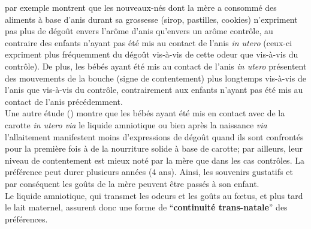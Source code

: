 \documentclass[french]{article}
\begin{document}
				\cite{schaal2000} par exemple montrent que les nouveaux-nés dont la mère a consommé des aliments à base d'anis durant sa grossesse (sirop, pastilles, cookies) n'expriment pas plus de dégoût envers l'arôme d'anis qu'envers un arôme contrôle, au contraire des enfants n'ayant pas été mis au contact de l'anis \textit{in utero} (ceux-ci expriment plus fréquemment du dégoût vis-à-vis de cette odeur que vis-à-vis du contrôle). De plus, les bébés ayant été mis au contact de l'anis \textit{in utero} présentent des mouvements de la bouche (signe de contentement) plus longtemps vis-à-vis de l'anis que vis-à-vis du contrôle, contrairement aux enfants n'ayant pas été mis au contact de l'anis précédemment.\\
				
				Une autre étude (\cite{mennella2001}) montre que les bébés ayant été mis en contact avec de la carotte \textit{in utero via} le liquide amniotique ou bien après la naissance \textit{via} l'allaitement manifestent moins d'expressions de dégoût quand ils sont confrontés pour la première fois à de la nourriture solide à base de carotte; par ailleurs, leur niveau de contentement est mieux noté par la mère que dans les cas contrôles. La préférence peut durer plusieurs années (4 ans). Ainsi, les souvenirs gustatifs et par conséquent les goûts de la mère peuvent être passés à son enfant.\\
				
				Le liquide amniotique, qui transmet les odeurs et les goûts au fœtus, et plus tard le lait maternel, assurent donc une forme de ``\textbf{continuité trans-natale}'' des préférences.\\
\end{document}
